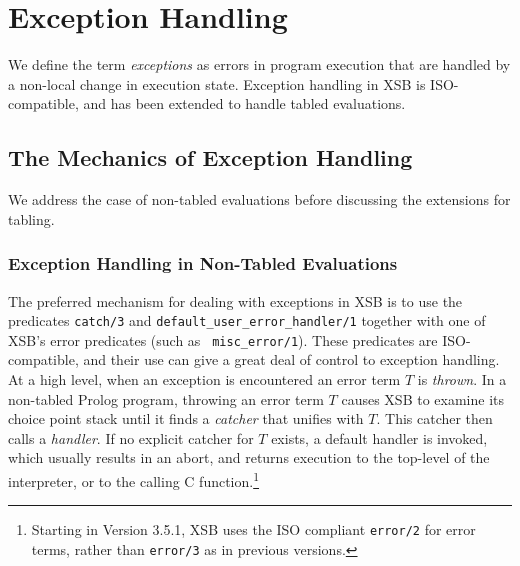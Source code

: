 \chapter{Exception Handling}\label{chap:exception}

We define the term {\em exceptions} as errors in program execution
that are handled by a non-local change in execution state.  Exception
handling in XSB is ISO-compatible, and has been extended to handle
tabled evaluations.  

\section{The Mechanics of Exception Handling}
%
We address the case of non-tabled evaluations before discussing the
extensions for tabling.

\subsection{Exception Handling in Non-Tabled Evaluations}
%
The preferred mechanism for dealing with exceptions in XSB is to use
the predicates {\tt catch/3} and {\tt default\_user\_error\_handler/1}
together with one of XSB's error predicates (such as {\tt
  misc\_error/1}).  These predicates are ISO-compatible, and their use
can give a great deal of control to exception handling.  At a high
level, when an exception is encountered an error term $T$ is {\em
  thrown}.  In a non-tabled Prolog program, throwing an error term $T$
causes XSB to examine its choice point stack until it finds a {\em
  catcher} that unifies with $T$.  This catcher then calls a {\em
  handler}.  If no explicit catcher for $T$ exists, a default handler
is invoked, which usually results in an abort, and returns execution
to the top-level of the interpreter, or to the calling C
function.\footnote{Starting in Version 3.5.1, XSB uses the ISO
  compliant {\tt error/2} for error terms, rather than {\tt error/3}
  as in previous versions.}

